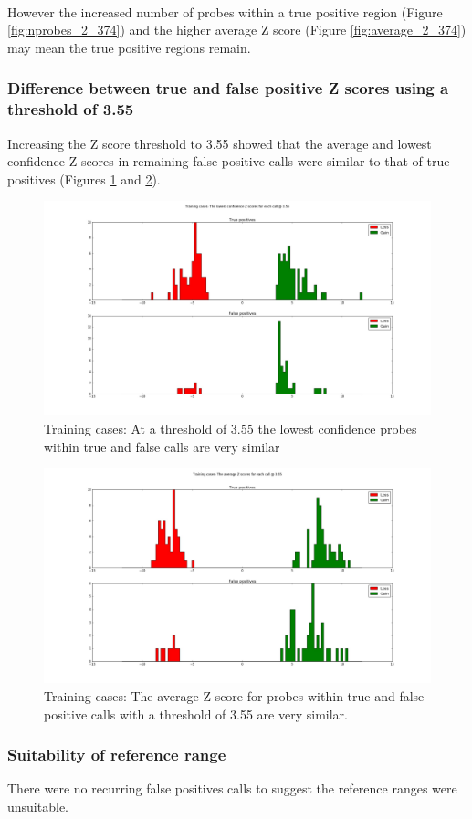 \paragraph*{}
However the increased number of probes within a true positive region (Figure \ref{fig:nprobes_2_374}) and the higher average Z score (Figure \ref{fig:average_2_374}) may mean the true positive regions remain.

\subsubsection{Difference between true and false positive Z scores using a threshold of 3.55}
Increasing the Z score threshold to 3.55 showed that the average and lowest confidence Z scores in remaining false positive calls were similar to that of true positives (Figures \ref{fig:lowest_3_55} and \ref{fig:average_3_55}).

\begin{figure}[h]
\centering
\includegraphics[width=1\linewidth]{./Figures/lowest_3_55}
\caption[Training cases: The lowest confidence probe within calls at a threshold of 3.55]{Training cases: At a threshold of 3.55 the lowest confidence probes within true and false calls are very similar}
\label{fig:lowest_3_55}
\end{figure}

\begin{figure}[h]
\centering
\includegraphics[width=1\linewidth]{./Figures/average_3_55}
\caption[Training cases:Average Z scores for calls made with a threshold of 3.55]{Training cases: The average Z score for probes within true and false positive calls with a threshold of 3.55 are very similar.}
\label{fig:average_3_55}
\end{figure}

\subsubsection{Suitability of reference range}
There were no recurring false positives calls to suggest the reference ranges were unsuitable.



